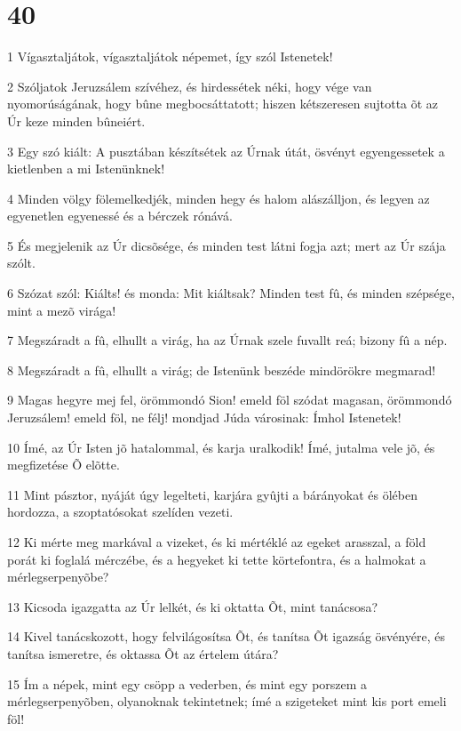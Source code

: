 \chapter{40}

\par 1 Vígasztaljátok, vígasztaljátok népemet, így szól Istenetek!
\par 2 Szóljatok Jeruzsálem szívéhez, és hirdessétek néki, hogy vége van nyomorúságának, hogy bûne megbocsáttatott; hiszen kétszeresen sujtotta õt az Úr keze minden bûneiért.
\par 3 Egy szó kiált: A pusztában készítsétek az Úrnak útát, ösvényt egyengessetek a kietlenben a mi Istenünknek!
\par 4 Minden völgy fölemelkedjék, minden hegy és halom alászálljon, és legyen az egyenetlen egyenessé és a bérczek rónává.
\par 5 És megjelenik az Úr dicsõsége, és minden test látni fogja azt; mert az Úr szája szólt.
\par 6 Szózat szól: Kiálts! és monda: Mit kiáltsak? Minden test fû, és minden szépsége, mint a mezõ virága!
\par 7 Megszáradt a fû, elhullt a virág, ha az Úrnak szele fuvallt reá; bizony fû a nép.
\par 8 Megszáradt a fû, elhullt a virág; de Istenünk beszéde mindörökre megmarad!
\par 9 Magas hegyre mej fel, örömmondó Sion! emeld föl szódat magasan, örömmondó Jeruzsálem! emeld föl, ne félj! mondjad Júda városinak: Ímhol Istenetek!
\par 10 Ímé, az Úr Isten jõ hatalommal, és karja uralkodik! Ímé, jutalma vele jõ, és megfizetése Õ elõtte.
\par 11 Mint pásztor, nyáját úgy legelteti, karjára gyûjti a bárányokat és ölében hordozza, a szoptatósokat szelíden vezeti.
\par 12 Ki mérte meg markával a vizeket, és ki mértéklé az egeket arasszal, a föld porát ki foglalá mérczébe, és a hegyeket ki tette körtefontra, és a halmokat a mérlegserpenyõbe?
\par 13 Kicsoda igazgatta az Úr lelkét, és ki oktatta Õt, mint tanácsosa?
\par 14 Kivel tanácskozott, hogy felvilágosítsa Õt, és tanítsa Õt igazság ösvényére, és tanítsa ismeretre, és oktassa Õt az értelem útára?
\par 15 Ím a népek, mint egy csöpp a vederben, és mint egy porszem a mérlegserpenyõben, olyanoknak tekintetnek; ímé a szigeteket mint kis port emeli föl!

